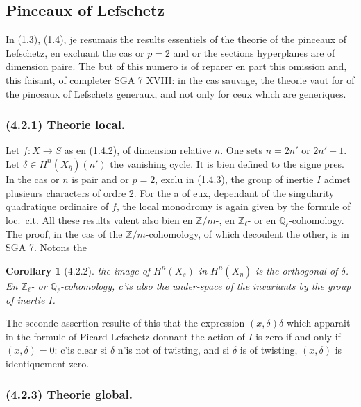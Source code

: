 \documentclass[12pt,a4paper]{article}
\theoremstyle{plain}
\newtheorem{corollary}[theorem]{Corollary}
\theoremstyle{definition}
\theoremstyle{remark}
\newcommand{\bbZ}{\mathbb{Z}}
\newcommand{\Zl}{\mathbb{Z}_\ell}
\newcommand{\Ql}{\mathbb{Q}_\ell}
\begin{document}
\subsection{Pinceaux of Lefschetz}

In (1.3), (1.4), je resumais the results essentiels of the theorie of the pinceaux of Lefschetz, en excluant the cas or $p=2$ and or the sections hyperplanes are of dimension paire. The but of this numero is of reparer en part this omission and, this faisant, of completer SGA 7 XVIII: in the cas sauvage, the theorie vaut for of the pinceaux of Lefschetz generaux, and not only for ceux which are generiques.

\subsubsection*{\textup{(4.2.1)} Theorie local.}

Let $f : X \to S$ as en (1.4.2), of dimension relative $n$. One sets $n = 2n'$ or $2n'+1$. Let $\delta \in H^n(X_{\overline{\eta}})(n')$ the vanishing cycle. It is bien defined to the signe pres. In the cas or $n$ is pair and or $p=2$, exclu in (1.4.3), the group of inertie $I$ admet plusieurs characters of ordre $2$. For the a of eux, dependant of the singularity quadratique ordinaire of $f$, the local monodromy is again given by the formule of loc.~cit. All these results valent also bien en $\bbZ/m$-, en $\Zl$- or en $\Ql$-cohomology. The proof, in the cas of the $\bbZ/m$-cohomology, of which decoulent the other, is in SGA 7. Notons the

\begin{corollary}[4.2.2]
the image of $H^n(X_s)$ in $H^n(X_{\overline{\eta}})$ is the orthogonal of $\delta$. En $\Zl$- or $\Ql$-cohomology, c'is also the under-space of the invariants by the group of inertie $I$.
\end{corollary}

The seconde assertion resulte of this that the expression $(x, \delta)\delta$ which apparait in the formule of Picard-Lefschetz donnant the action of $I$ is zero if and only if $(x, \delta) = 0$: c'is clear si $\delta$ n'is not of twisting, and si $\delta$ is of twisting, $(x, \delta)$ is identiquement zero.

\subsubsection*{\textup{(4.2.3)} Theorie global.}
\end{document}
